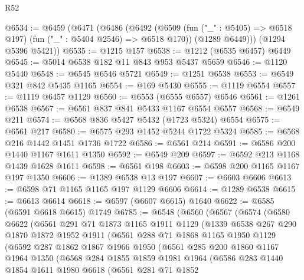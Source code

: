 \begin{lexlean}{R52}
\begin{coremodule}
@6534 := @6459
    (@6471
      (@6486
        (@6492
          (@6509 (fun ("_" : @5405) => @6518 @197) (fun ("_" : @5404 @2546) => @6518 @170))
          (@1289 @6449)))
      (@1294 @5396 @5421))
@6535 := @1215 @157
@6538 := @1212 (@6535 @6457) @6449
@6545 := @5014 @6538 @182 @11 @843 @953 @5437 @5659
@6546 := @1120 @5440
@6548 := @6545 @6546 @5721
@6549 := @1251 @6538
@6553 := @6549 @321 @842 @5435 @1165
@6554 := @169 @5430
@6555 := @1119 @6554
@6557 := @1119 @6457 @1129
@6560 := @6553 (@6555 @6557) @6546
@6561 := @1261 @6538
@6567 := @6561 @837 @841 @5433 @1167 @6554 @6557
@6568 := @6549 @211
@6574 := @6568 @836 @5427 @5432 (@1723 @5324) @6554
@6575 := @6561 @217
@6580 := @6575 @293 @1452 @5244 @1722 @5324
@6585 := @6568 @216 @1442 @1451 @1736 @1722
@6586 := @6561 @214
@6591 := @6586 @200 @1440 @1167 @1611 @1350
@6592 := @6549 @209
@6597 := @6592 @213 @1168 @1439 @1628 @1611
@6598 := @6561 @198
@6603 := @6598 @200 @1165 @1167 @197 @1350
@6606 := @1389 @6538 @13 @197
@6607 := @6603 @6606
@6613 := @6598 @71 @1165 @1165 @197 @1129 @6606
@6614 := @1289 @6538
@6615 := @6613 @6614
@6618 := @6597 (@6607 @6615) @1640
@6622 := @6585 (@6591 @6618 @6615) @1749
@6785 := @6548
    (@6560
      (@6567
        (@6574
          (@6580
            @6622
            (@6561
              @291
              @71
              @1873
              @1165
              @1911
              @1129
              (@1339
                @6538
                @267
                @290
                @1870
                @1872
                @1952
                @1911
                (@6561
                  @288
                  @71
                  @1868
                  @1165
                  @1950
                  @1129
                  (@6592
                    @287
                    @1862
                    @1867
                    @1966
                    @1950
                    (@6561
                      @285
                      @200
                      @1860
                      @1167
                      @1964
                      @1350
                      (@6568
                        @284
                        @1855
                        @1859
                        @1981
                        @1964
                        (@6586
                          @283
                          @1440
                          @1854
                          @1611
                          @1980
                          @6618
                          (@6561
                            @281
                            @71
                            @1852

\end{coremodule}
\end{lexlean}
